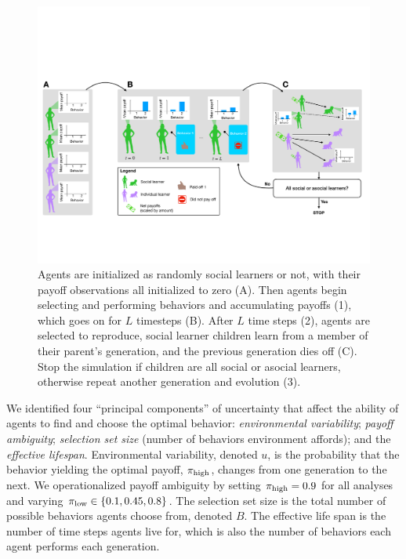 \documentclass[letterpaper,11.5pt]{scrartcl}
\begin{document}
\begin{figure}
  \caption{Agents are initialized as randomly social learners or not, with their
  payoff observations all initialized to zero (A). Then agents begin selecting
and performing behaviors and accumulating payoffs (1), which goes on for $L$
timesteps (B). After $L$ time steps (2), agents are selected to reproduce,
social learner children learn from a member of their parent's generation, and
the previous generation dies off (C). Stop the simulation if children are all
social or asocial learners, otherwise repeat another generation and evolution (3).}
  \label{fig:schematic}
  \centering
    \includegraphics[width=\textwidth]{Figures/IntraInterGenerationalDynamics.pdf}
\end{figure}


We identified four ``principal components'' of uncertainty that affect the
ability of agents to find and choose the optimal behavior: 
\emph{environmental variability}; \emph{payoff ambiguity}; \emph{selection set size}
(number of behaviors environment affords); and the \emph{effective lifespan}.
Environmental variability, denoted $u$, is the probability that the behavior
yielding the optimal payoff, $\pi_{\mathrm{high}}$, changes from one generation to the next.
We operationalized payoff ambiguity by setting $\pi_{\mathrm{high}} = 0.9$ for all analyses
and varying $\pi_{\mathrm{low}} \in \{0.1, 0.45, 0.8\}$. The selection set size is the
total number of possible behaviors agents choose from, denoted $B$. The 
effective life span is the number of time steps agents live for, which is
also the number of behaviors each agent performs each generation.
\end{document}
